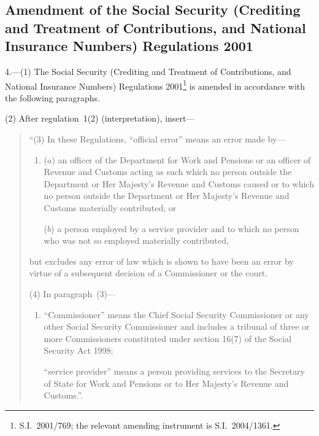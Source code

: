 \documentclass[12pt,a4paper]{article}
\begin{document}
\subsection[4. Amendment of the Social Security (Crediting and Treatment of Contributions, and National Insurance Numbers) Regulations 2001]{Amendment of the Social Security (Crediting and Treatment of Contributions, and National Insurance Numbers) Regulations 2001}

4.---(1)  The Social Security (Crediting and Treatment of Contributions, and National Insurance Numbers) Regulations 2001\footnote{S.I.~2001/769; the relevant amending instrument is S.I.~2004/1361.} is amended in accordance with the following paragraphs.

(2) After regulation~1(2) (interpretation), insert—
\begin{quotation}
“(3) In these Regulations, “official error” means an error made by—
\begin{enumerate}\item[]
($a$) an officer of the Department for Work and Pensions or an officer of Revenue and Customs acting as such which no person outside the Department or Her Majesty’s Revenue and Customs caused or to which no person outside the Department or Her Majesty’s Revenue and Customs materially contributed; or

($b$) a person employed by a service provider and to which no person who was not so employed materially contributed,
\end{enumerate}
but excludes any error of law which is shown to have been an error by virtue of a subsequent decision of a Commissioner or the court.

(4) In paragraph~(3)—
\begin{enumerate}\item[]
“Commissioner” means the Chief Social Security Commissioner or any other Social Security Commissioner and includes a tribunal of three or more Commissioners constituted under section 16(7) of the Social Security Act 1998;

“service provider” means a person providing services to the Secretary of State for Work and Pensions or to Her Majesty’s Revenue and Customs.”.
\end{enumerate}
\end{quotation}
\end{document}
